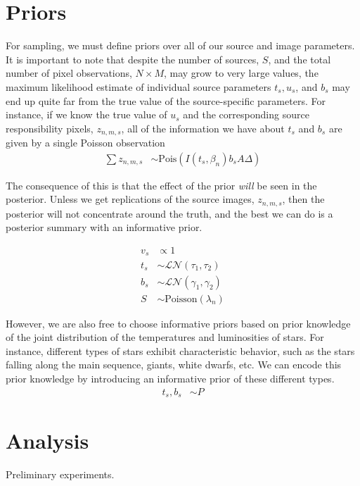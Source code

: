 \documentclass[11pt]{article}
\begin{document}
\section{Priors}
For sampling, we must define priors over all of our source and image parameters.  It is important to note that despite the number of sources, $S$, and the total number of pixel observations, $N \times M$, may grow to very large values, the maximum likelihood estimate of individual source parameters $t_s, u_s$, and $b_s$ may end up quite far from the true value of the source-specific parameters.  For instance, if we know the true value of $u_s$ and the corresponding source responsibility pixels, $z_{n,m,s}$, all of the information we have about $t_s$ and $b_s$ are given by a single Poisson observation 
\begin{align}
  \sum z_{n,m,s} &\sim \textrm{Pois}\left( I(t_s, \beta_n) b_s A \Delta \right) 
\end{align}

The consequence of this is that the effect of the prior \emph{will} be seen in the posterior.  Unless we get replications of the source images, $z_{n,m,s}$, then the posterior will not concentrate around the truth, and the best we can do is a posterior summary with an informative prior.  

\begin{align}
  v_s &\propto 1 \\
  t_s &\sim \mathcal{LN}(\tau_1, \tau_2) \\
  b_s &\sim \mathcal{LN}(\gamma_1, \gamma_2) \\
  S   &\sim \textrm{Poisson}(\lambda_n) 
\end{align}


However, we are also free to choose informative priors based on prior knowledge of the joint distribution of the temperatures and luminosities of stars.  For instance, different types of stars exhibit characteristic behavior, such as the stars falling along the main sequence, giants, white dwarfs, etc.  We can encode this prior knowledge by introducing an informative prior of these different types.  
\begin{align}
  t_s, b_s &\sim P
\end{align}


\section{Analysis}

Preliminary experiments.  
\end{document}
